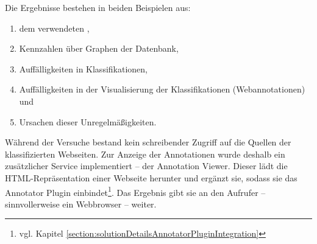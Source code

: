     Die Ergebnisse bestehen in beiden Beispielen aus:

    \begin{enumerate}
        \item dem verwendeten {\classificationModel},
        \item Kennzahlen über Graphen der Datenbank,
        \item Auffälligkeiten in Klassifikationen,
        \item Auffälligkeiten in der Visualisierung der Klassifikationen (Webannotationen) und
        \item Ursachen dieser Unregelmäßigkeiten.
    \end{enumerate}

    Während der Versuche bestand kein schreibender Zugriff auf die Quellen der klassifizierten Webseiten.
    Zur Anzeige der Annotationen wurde deshalb ein zusätzlicher Service implementiert -- der Annotation Viewer.
    Dieser lädt die HTML-Repräsentation einer Webseite herunter und ergänzt sie,
    sodass sie das Annotator Plugin einbindet\footnote{vgl. Kapitel \ref{section:solutionDetailsAnnotatorPluginIntegration}}.
    Das Ergebnis gibt sie an den Aufrufer -- sinnvollerweise ein Webbrowser -- weiter.
